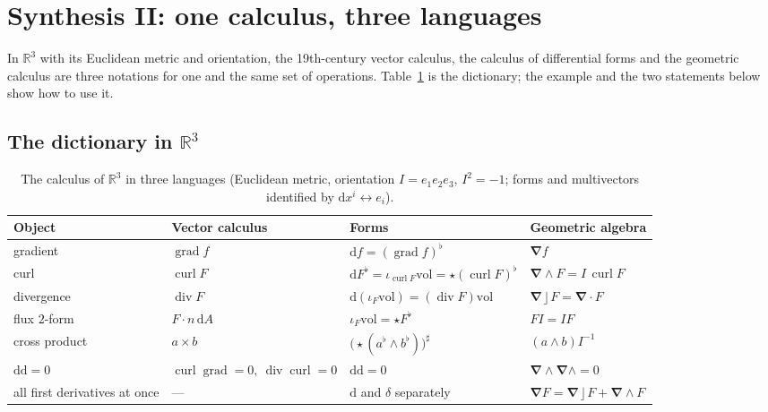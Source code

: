 \documentclass[11pt,a4paper]{article}
\renewcommand{\arraystretch}{1.25}
\numberwithin{equation}{section}
\theoremstyle{definition}
\theoremstyle{plain}
\newcommand{\R}{\mathbb{R}}
\newcommand{\dd}{\mathrm{d}}
\newcommand{\vol}{\mathrm{vol}}
\newcommand{\lc}{\mathbin{\rfloor}}
\newcommand{\pss}{I}
\newcommand{\hodge}{\star}
\newcommand{\codiff}{\delta}
\newcommand{\vd}{\boldsymbol{\nabla}}               %
\begin{document}


\section{Synthesis II: one calculus, three languages}\label{sec:synth2}

\begin{synthesis}
In $\R^3$ with its Euclidean metric and orientation, the 19th-century vector calculus, the calculus of differential forms and the geometric calculus
are three notations for one and the same set of operations. Table~\ref{tab:dictionary3} is the dictionary; the example and the two statements below show how to use it.
\end{synthesis}

\subsection{The dictionary in $\R^3$}

\begin{table}[ht]
\centering
\small
\renewcommand{\arraystretch}{1.4}
\begin{tabular}{@{}p{3.0cm}p{3.4cm}p{4.2cm}p{4.0cm}@{}}
\toprule
\textbf{Object} & \textbf{Vector calculus} & \textbf{Forms} & \textbf{Geometric algebra}\\
\midrule
gradient & $\operatorname{grad}f$ & $\dd f=(\operatorname{grad}f)^\flat$ & $\vd f$\\
curl & $\operatorname{curl}F$ & $\dd F^\flat=\iota_{\operatorname{curl}F}\vol=\hodge(\operatorname{curl}F)^\flat$ & $\vd\wedge F=\pss\,\operatorname{curl}F$\\
divergence & $\operatorname{div}F$ & $\dd(\iota_F\vol)=(\operatorname{div}F)\vol$ & $\vd\lc F=\vd\cdot F$\\
flux $2$-form & $F\cdot n\,\dd A$ & $\iota_F\vol=\hodge F^\flat$ & $F\pss=\pss F$\\
cross product & $a\times b$ & $\bigl(\hodge(a^\flat\wedge b^\flat)\bigr)^\sharp$ & $(a\wedge b)\pss^{-1}$\\
$\dd\dd=0$ & $\operatorname{curl}\operatorname{grad}=0,\ \operatorname{div}\operatorname{curl}=0$ & $\dd\dd=0$ & $\vd\wedge\vd\wedge=0$\\
all first derivatives at once & --- & $\dd$ and $\codiff$ separately & $\vd F=\vd\lc F+\vd\wedge F$\\
\bottomrule
\end{tabular}
\caption{The calculus of $\R^3$ in three languages (Euclidean metric, orientation $\pss=e_1e_2e_3$, $\pss^2=-1$; forms and multivectors identified by $\dd x^i\leftrightarrow e_i$).}
\label{tab:dictionary3}
\end{table}
\end{document}
